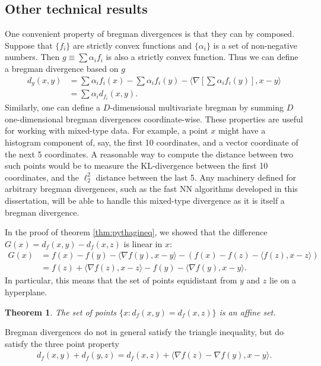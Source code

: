 \documentclass{article}
\newtheorem{theorem}{Theorem}
\begin{document}
\subsection{Other technical results}
One convenient property of bregman divergences is that they can by
composed.  Suppose that $\{f_i\}$ are strictly convex functions and
$\{\alpha_i\}$ is a set of non-negative numbers.  Then $g\equiv\sum\alpha_i
f_i$ is also a strictly convex function. Thus we can define a bregman
divergence based on $g$
\begin{align*}
d_g(x,y) &= \sum \alpha_i f_i(x) - \sum\alpha_i f_i(y) -\langle \nabla
\left[ \sum\alpha_i f_i(y)\right],x-y \rangle\\
&= \sum \alpha_id_{f_i}(x,y).
\end{align*}
Similarly, one can define a $D$-dimensional multivariate bregman
by summing $D$ one-dimensional bregman divergences coordinate-wise.
These properties are useful for working with mixed-type data.  For
example, a point $x$ might have a histogram component of, say, the first
10 coordinates, and a vector coordinate of the next 5 coordinates.
A reasonable way to compute the distance between two such points would
be to measure the KL-divergence between the first 10 coordinates, and
the $\ell_2^2$ distance between the last 5.  Any machinery defined for
arbitrary bregman divergences, such as the fast NN algorithms
developed in this dissertation, will be able to handle this mixed-type
divergence as it is itself a bregman divergence.  


In the proof of theorem \ref{thm:pythagineq}, we showed that the
difference $G(x)=d_f(x,y) - d_f(x,z)$ is linear in $x$:
\begin{align*}
G(x) &= f(x)-f(y)- \langle \nabla f(y),x-y \rangle -\left( f(x) - f(z)
  -\langle f(z),x-z \rangle \right)\\
&= f(z) + \langle \nabla f(z),x-z \rangle - f(y) - \langle \nabla
f(y), x-y \rangle.
\end{align*}
In particular, this means that the set of points equidistant from $y$
and $z$ lie on a hyperplane.
\begin{theorem}
The set of points $\{x: d_f(x,y) = d_f(x,z)\}$ is an affine set. 
\end{theorem}

Bregman divergences do not in general satisfy the triangle inequality,
but do satisfy the three point property
\begin{align*}
d_f(x,y) + d_f(y,z) = d_f(x,z) + \langle \nabla f(z) - \nabla f(y),x-y
\rangle. 
\end{align*}
\end{document}
